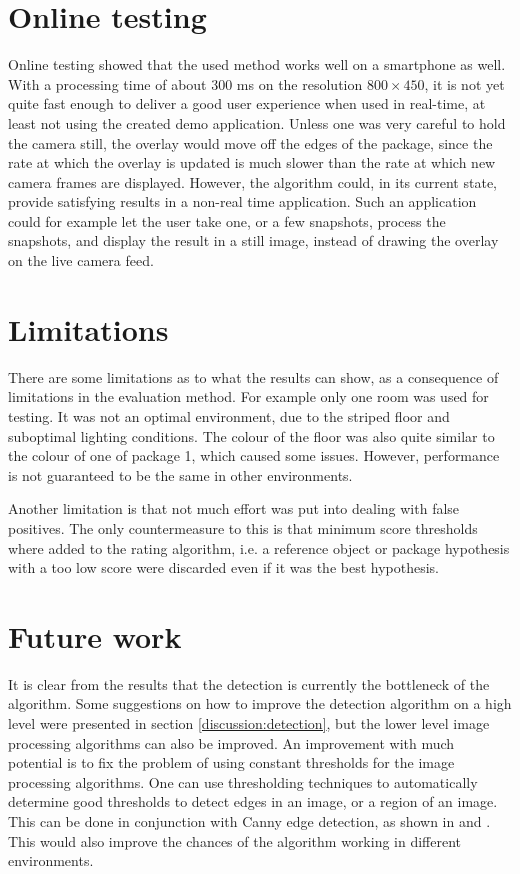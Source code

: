 \section{Online testing} %
Online testing showed that the used method works well on a smartphone as well.
With a processing time of about 300 ms on the resolution $800 \times 450$, it is not yet quite fast enough to deliver a good user experience when used in real-time, at least not using the created demo application.
Unless one was very careful to hold the camera still, the overlay would move off the edges of the package, since the rate at which the overlay is updated is much slower than the rate at which new camera frames are displayed.
However, the algorithm could, in its current state, provide satisfying results in a non-real time application.
Such an application could for example let the user take one, or a few snapshots, process the snapshots, and display the result in a still image, instead of drawing the overlay on the live camera feed.

\section{Limitations}									
There are some limitations as to what the results can show, as a consequence of limitations in the evaluation method.
For example only one room was used for testing.
It was not an optimal environment, due to the striped floor and suboptimal lighting conditions.
The colour of the floor was also quite similar to the colour of one of package 1, which caused some issues.
However, performance is not guaranteed to be the same in other environments.

Another limitation is that not much effort was put into dealing with false positives.
The only countermeasure to this is that minimum score thresholds where added to the rating algorithm, i.e. a reference object or package hypothesis with a too low score were discarded even if it was the best hypothesis.

\section{Future work} \label{discussion:future_work}
It is clear from the results that the detection is currently the bottleneck of the algorithm.
Some suggestions on how to improve the detection algorithm on a high level were presented in section \ref{discussion:detection}, but the lower level image processing algorithms can also be improved.
An improvement with much potential is to fix the problem of using constant thresholds for the image processing algorithms.
One can use thresholding techniques to automatically determine good thresholds to detect edges in an image, or a region of an image.
This can be done in conjunction with Canny edge detection, as shown in \cite{wang2005fast} and \cite{liu2004automated}.
This would also improve the chances of the algorithm working in different environments.

